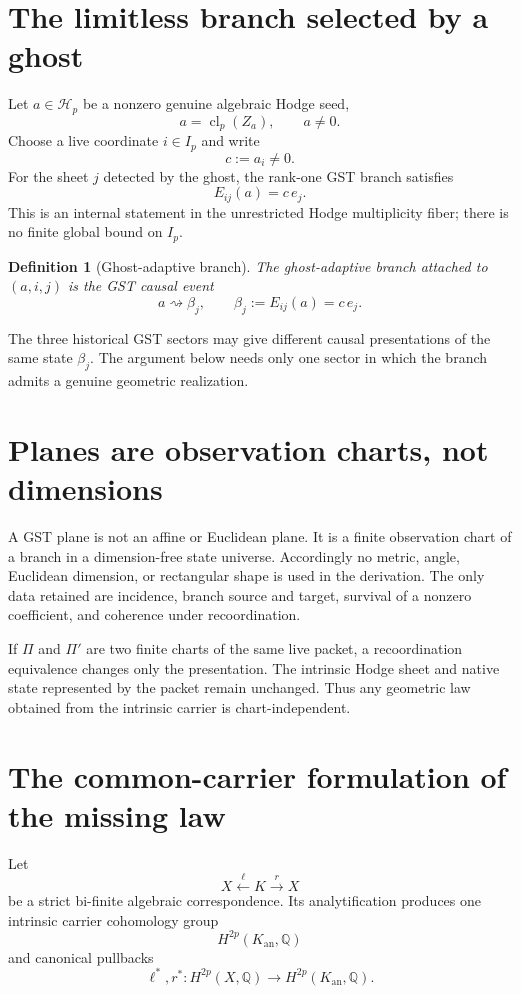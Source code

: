 \documentclass[11pt]{article}
\newtheorem{definition}{Definition}[section]
\newcommand{\Q}{\mathbb{Q}}
\newcommand{\cl}{\operatorname{cl}}
\newcommand{\Hdg}{\mathcal{H}}
\begin{document}
\section{The limitless branch selected by a ghost}

Let $a\in\Hdg_p$ be a nonzero genuine algebraic Hodge seed,
\[
  a=\cl_p(Z_a),\qquad a\ne0.
\]
Choose a live coordinate $i\in I_p$ and write
\[
  c:=a_i\ne0.
\]
For the sheet $j$ detected by the ghost, the rank-one GST branch satisfies
\[
  E_{ij}(a)=c\,e_j. \tag{2.1}
\]
This is an internal statement in the unrestricted Hodge multiplicity fiber;
there is no finite global bound on $I_p$.

\begin{definition}[Ghost-adaptive branch]
The ghost-adaptive branch attached to $(a,i,j)$ is the GST causal event
\[
   a\rightsquigarrow \beta_j,
   \qquad
   \beta_j:=E_{ij}(a)=c\,e_j.
\]
\end{definition}

The three historical GST sectors may give different causal presentations of
the same state $\beta_j$.  The argument below needs only one sector in which
the branch admits a genuine geometric realization.

\section{Planes are observation charts, not dimensions}

A GST plane is not an affine or Euclidean plane.  It is a finite observation
chart of a branch in a dimension-free state universe.  Accordingly no metric,
angle, Euclidean dimension, or rectangular shape is used in the derivation.
The only data retained are incidence, branch source and target, survival of a
nonzero coefficient, and coherence under recoordination.

If $\Pi$ and $\Pi'$ are two finite charts of the same live packet, a
recoordination equivalence changes only the presentation.  The intrinsic Hodge
sheet and native state represented by the packet remain unchanged.  Thus any
geometric law obtained from the intrinsic carrier is chart-independent.

\section{The common-carrier formulation of the missing law}

Let
\[
  X \xleftarrow{\,\ell\,} K \xrightarrow{\,r\,} X
\]
be a strict bi-finite algebraic correspondence.  Its analytification produces
one intrinsic carrier cohomology group
\[
  H^{2p}(K_{\mathrm{an}},\Q)
\]
and canonical pullbacks
\[
  \ell^*,r^*:H^{2p}(X,\Q)\longrightarrow H^{2p}(K_{\mathrm{an}},\Q).
\]
\end{document}
